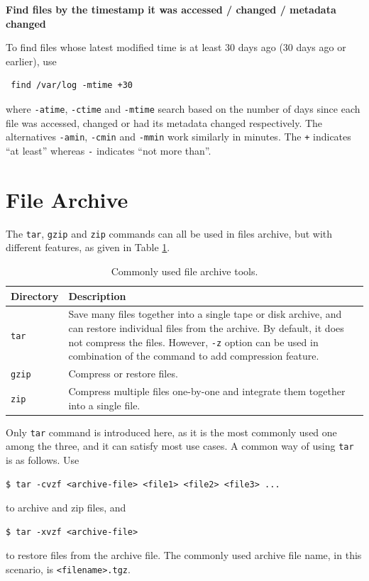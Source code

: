 \vspace{0.1in}
\noindent \textbf{Find files by the timestamp it was accessed / changed / metadata changed}
\vspace{0.1in}

To find files whose latest modified time is at least 30 days ago (30 days ago or earlier), use
\begin{lstlisting}
 find /var/log -mtime +30
\end{lstlisting}
where \verb|-atime|, \verb|-ctime| and \verb|-mtime| search based on the number of days since each file was accessed, changed or had its metadata changed respectively. The alternatives \verb|-amin|, \verb|-cmin| and \verb|-mmin| work similarly in minutes. The \verb|+| indicates ``at least'' whereas \verb|-| indicates ``not more than''.

\section{File Archive}

The \verb|tar|, \verb|gzip| and \verb|zip| commands can all be used in files archive, but with different features, as given in Table \ref{ch:fm:tab:filearchivetools}.

\begin{table}
	\centering \caption{Commonly used file archive tools.}\label{ch:fm:tab:filearchivetools}
	\begin{tabularx}{\textwidth}{lX}
		\hline
		Directory & Description \\ \hline
		\verb|tar| & Save many files together into a single tape or disk archive, and can
		restore individual files from the archive. By default, it does not compress the files. However, \verb|-z| option can be used in combination of the command to add compression feature. \\ 
		\verb|gzip| & Compress or restore files. \\ 
		\verb|zip| & Compress multiple files one-by-one and integrate them together into a single file. \\
		\hline
	\end{tabularx}
\end{table}

Only \verb|tar| command is introduced here, as it is the most commonly used one among the three, and it can satisfy most use cases. A common way of using \verb|tar| is as follows. Use
\begin{lstlisting}
$ tar -cvzf <archive-file> <file1> <file2> <file3> ...
\end{lstlisting}
to archive and zip files, and
\begin{lstlisting}
$ tar -xvzf <archive-file>
\end{lstlisting}
to restore files from the archive file. The commonly used archive file name, in this scenario, is \verb|<filename>.tgz|.

